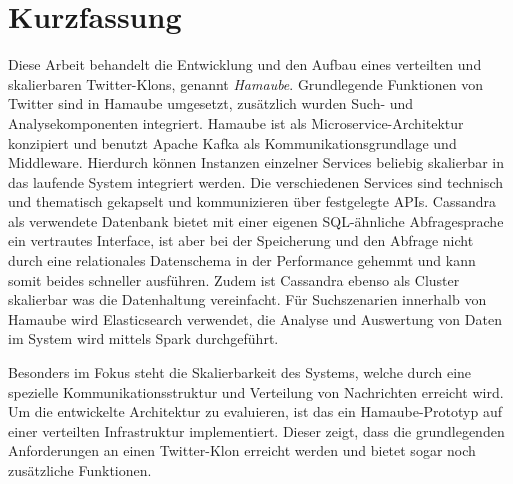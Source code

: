 




\newpage

\chapter*{Kurzfassung}
Diese Arbeit behandelt die Entwicklung und den Aufbau eines verteilten und skalierbaren Twitter-Klons, genannt \textit{Hamaube}. Grundlegende Funktionen von Twitter sind in Hamaube umgesetzt, zusätzlich wurden Such- und Analysekomponenten integriert. Hamaube ist als Microservice-Architektur konzipiert und benutzt Apache Kafka als Kommunikationsgrundlage und Middleware. Hierdurch können Instanzen einzelner Services beliebig skalierbar in das laufende System integriert werden. Die verschiedenen Services sind technisch und thematisch gekapselt und kommunizieren über festgelegte APIs.
 Cassandra als verwendete Datenbank bietet mit einer eigenen SQL-ähnliche Abfragesprache ein vertrautes Interface, ist aber bei der Speicherung und den Abfrage nicht durch eine relationales Datenschema in der Performance gehemmt und kann somit beides schneller ausführen. Zudem ist Cassandra ebenso als Cluster skalierbar was die Datenhaltung vereinfacht. 
Für Suchszenarien innerhalb von Hamaube wird Elasticsearch verwendet, die Analyse und Auswertung von Daten im System wird mittels Spark durchgeführt.

Besonders im Fokus steht die Skalierbarkeit des Systems, welche durch eine spezielle Kommunikationsstruktur und Verteilung von Nachrichten erreicht wird. Um die entwickelte Architektur zu evaluieren, ist das ein Hamaube-Prototyp auf einer verteilten Infrastruktur implementiert. Dieser zeigt, dass die grundlegenden Anforderungen an einen Twitter-Klon erreicht werden und bietet sogar noch zusätzliche Funktionen.




